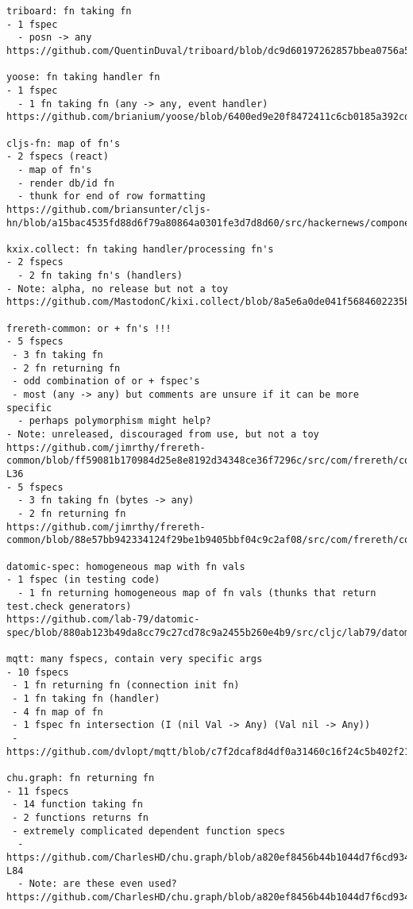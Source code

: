 \begin{verbatim}
triboard: fn taking fn
- 1 fspec
  - posn -> any
https://github.com/QuentinDuval/triboard/blob/dc9d60197262857bbea0756a5a395ba248929961/src/cljs/triboard/view/frame.cljs#L15

yoose: fn taking handler fn
- 1 fspec
  - 1 fn taking fn (any -> any, event handler)
https://github.com/brianium/yoose/blob/6400ed9e20f8472411c6cb0185a392cda097a0b8/src/brianium/yoose/spec.clj#L9

cljs-fn: map of fn's
- 2 fspecs (react)
  - map of fn's
  - render db/id fn
  - thunk for end of row formatting
https://github.com/briansunter/cljs-hn/blob/a15bac4535fd88d6f79a80864a0301fe3d7d8d60/src/hackernews/components/list.cljs#L15

kxix.collect: fn taking handler/processing fn's
- 2 fspecs
  - 2 fn taking fn's (handlers)
- Note: alpha, no release but not a toy
https://github.com/MastodonC/kixi.collect/blob/8a5e6a0de041f5684602235be6466afa805be92d/src/kixi/collect/aggregate.clj#L15

frereth-common: or + fn's !!!
- 5 fspecs
 - 3 fn taking fn
 - 2 fn returning fn
 - odd combination of or + fspec's
 - most (any -> any) but comments are unsure if it can be more specific
  - perhaps polymorphism might help?
- Note: unreleased, discouraged from use, but not a toy
https://github.com/jimrthy/frereth-common/blob/ff59081b170984d25e8e8192d34348ce36f7296c/src/com/frereth/common/methods.cljc#L33-L36
- 5 fspecs
  - 3 fn taking fn (bytes -> any)
  - 2 fn returning fn
https://github.com/jimrthy/frereth-common/blob/88e57bb942334124f29be1b9405bbf04c9c2af08/src/com/frereth/common/aleph.clj#L98

datomic-spec: homogeneous map with fn vals
- 1 fspec (in testing code)
  - 1 fn returning homogeneous map of fn vals (thunks that return test.check generators)
https://github.com/lab-79/datomic-spec/blob/880ab123b49da8cc79c27cd78c9a2455b260e4b9/src/cljc/lab79/datomic_spec/gen_overrides.cljc#L6

mqtt: many fspecs, contain very specific args
- 10 fspecs
 - 1 fn returning fn (connection init fn)
 - 1 fn taking fn (handler)
 - 4 fn map of fn
 - 1 fspec fn intersection (I (nil Val -> Any) (Val nil -> Any))
 - 
https://github.com/dvlopt/mqtt/blob/c7f2dcaf8d4df0a31460c16f24c5b402f21df655/src/dvlopt/mqtt/v3.clj

chu.graph: fn returning fn
- 11 fspecs
 - 14 function taking fn
 - 2 functions returns fn
 - extremely complicated dependent function specs
  - https://github.com/CharlesHD/chu.graph/blob/a820ef8456b44b1044d7f6cd9340a5504ad393de/src/chu/graph.cljc#L78-L84
  - Note: are these even used?
https://github.com/CharlesHD/chu.graph/blob/a820ef8456b44b1044d7f6cd9340a5504ad393de/src/chu/graph.cljc#L17


\end{verbatim}

